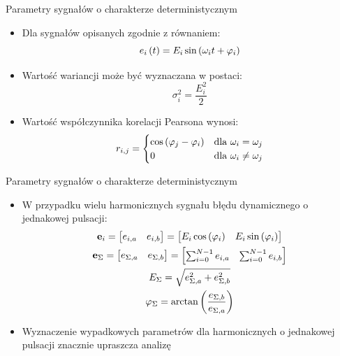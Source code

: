 \documentclass[12pt, polish, aspectratio = 169]{beamer}
\begin{document}
\begin{frame}{Parametry sygnałów o charakterze deterministycznym}
\begin{itemize}
\item Dla sygnałów opisanych zgodnie z równaniem:
\begin{equation}
e_{i} \left(t\right) = E_{i} \sin \left( \omega_{i} t + \varphi_{i} \right) \label{eq:dyn_harm}
\end{equation}
\item Wartość wariancji może być wyznaczana w postaci:
\begin{equation}
\sigma_{i}^{2} = \frac{E_{i}^{2}}{2} \label{eq:dyn_var}
\end{equation}
\item Wartość współczynnika korelacji Pearsona wynosi:
\begin{equation}
r_{i,j} =
\begin{cases}
\cos \left( \varphi_{j} - \varphi_{i} \right) & $dla $ \omega_{i} = \omega_{j} \\
0                                             & $dla $ \omega_{i} \ne \omega_{j}
\end{cases}
\label{eq:dyn_corr}
\end{equation}
\end{itemize}
\end{frame}

\begin{frame}{Parametry sygnałów o charakterze deterministycznym}
\begin{itemize}
\item W przypadku wielu harmonicznych sygnału błędu dynamicznego o jednakowej pulsacji:
\begin{gather}
\mathbf{e}_{i} =
\begin{bmatrix}
e_{i,a} & e_{i,b}
\end{bmatrix}
=
\begin{bmatrix}
E_{i} \cos \left(\varphi_{i}\right) & E_{i} \sin \left(\varphi_{i}\right)
\end{bmatrix}
\label{eq:dyn_vect} \\
\mathbf{e}_{\Sigma} =
\begin{bmatrix}
e_{\Sigma,a} & e_{\Sigma,b}
\end{bmatrix}
=
\begin{bmatrix}
\sum _{i = 0} ^{N-1} e_{i,a} & \sum _{i = 0} ^{N-1} e_{i,b}
\end{bmatrix}
\label{eq:dyn_vect_sum} \\
E_{\Sigma} = \sqrt{e_{\Sigma,a}^{2} + e_{\Sigma,b}^{2}} \label{eq:dyn_vect_amp} \\
\varphi_{\Sigma} = \arctan \left(\frac{e_{\Sigma,b}}{e_{\Sigma,a}}\right) \label{eq:dyn_vect_phi}
\end{gather}
\item Wyznaczenie wypadkowych parametrów dla harmonicznych o jednakowej pulsacji znacznie upraszcza analizę
\end{itemize}
\end{frame}
\end{document}
